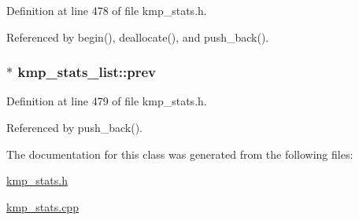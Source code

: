 Definition at line 478 of file kmp\-\_\-stats.\-h.



Referenced by begin(), deallocate(), and push\-\_\-back().

\hypertarget{classkmp__stats__list_a247f44ee360e3e51e4c48ce3fe2372cd}{
\subsubsection[{prev}]{$\ast$ kmp\-\_\-stats\-\_\-list\-::prev\hspace{0.3cm}{\ttfamily [private]}}}\label{classkmp__stats__list_a247f44ee360e3e51e4c48ce3fe2372cd}


Definition at line 479 of file kmp\-\_\-stats.\-h.



Referenced by push\-\_\-back().



The documentation for this class was generated from the following files\-:\begin{DoxyCompactItemize}
\item 
\hyperlink{kmp__stats_8h}{kmp\-\_\-stats.\-h}\item 
\hyperlink{kmp__stats_8cpp}{kmp\-\_\-stats.\-cpp}\end{DoxyCompactItemize}
